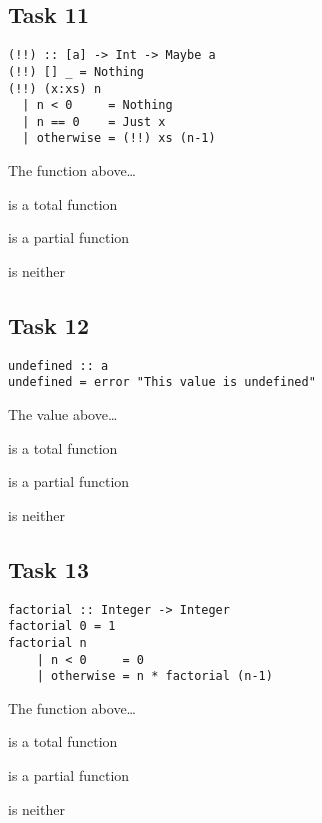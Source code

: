 \documentclass{article}
\begin{document}
\subsection*{Task 11}
\begin{lstlisting}
(!!) :: [a] -> Int -> Maybe a
(!!) [] _ = Nothing
(!!) (x:xs) n
  | n < 0     = Nothing
  | n == 0    = Just x 
  | otherwise = (!!) xs (n-1)
\end{lstlisting}
The function above\ldots
\begin{deloppgaver}
    \item is a total function
    \item is a partial function
    \item is neither
\end{deloppgaver}

\subsection*{Task 12}
\begin{lstlisting}
undefined :: a
undefined = error "This value is undefined"
\end{lstlisting}
The value above\ldots
\begin{deloppgaver}
    \item is a total function
    \item is a partial function
    \item is neither
\end{deloppgaver}

\subsection*{Task 13}
\begin{lstlisting}
factorial :: Integer -> Integer
factorial 0 = 1
factorial n 
    | n < 0     = 0
    | otherwise = n * factorial (n-1)
\end{lstlisting}
The function above\ldots
\begin{deloppgaver}
    \item is a total function
    \item is a partial function
    \item is neither
\end{deloppgaver}
\end{document}
